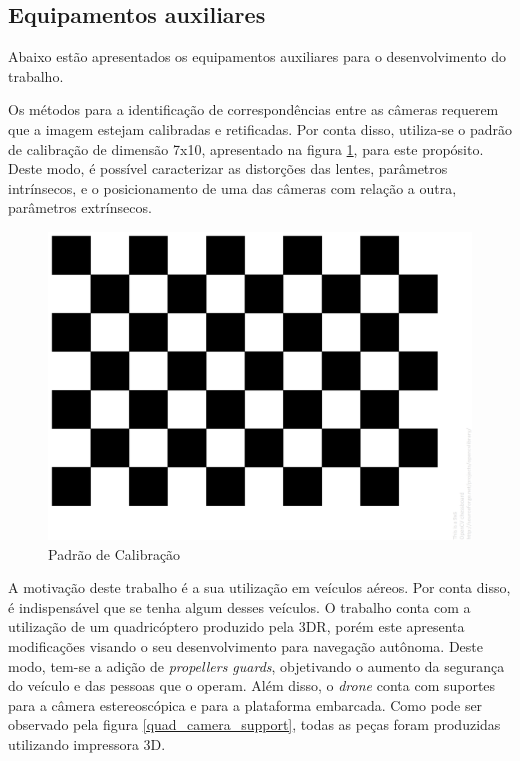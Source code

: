 \subsection{Equipamentos auxiliares}

Abaixo estão apresentados os equipamentos auxiliares para o desenvolvimento do trabalho. 

Os métodos para a identificação de correspondências entre as câmeras requerem que a imagem estejam calibradas e retificadas. Por conta disso, utiliza-se o padrão de calibração de dimensão 7x10, apresentado na figura \ref{calibration_pattern}, para este propósito. Deste modo, é possível caracterizar as distorções das lentes, parâmetros intrínsecos, e o posicionamento de uma das câmeras com relação a outra, parâmetros extrínsecos.  

\begin{figure}[H]
 	\centering
 	\includegraphics[scale=0.10]{./Resources/calibration_pattern.png}
 	\caption{Padrão de Calibração}
 	\label{calibration_pattern}
\end{figure}

A motivação deste trabalho é a sua utilização em veículos aéreos. Por conta disso, é indispensável que se tenha algum desses veículos. O trabalho conta com a utilização de um quadricóptero produzido pela 3DR, porém este apresenta modificações visando o seu desenvolvimento para navegação autônoma. Deste modo, tem-se a adição de \textit{propellers guards}, objetivando o aumento da segurança do veículo e das pessoas que o operam. Além disso, o \textit{drone} conta com suportes para a câmera estereoscópica e para a plataforma embarcada. Como pode ser observado pela figura \ref{quad_camera_support}, todas as peças foram produzidas utilizando impressora 3D.

